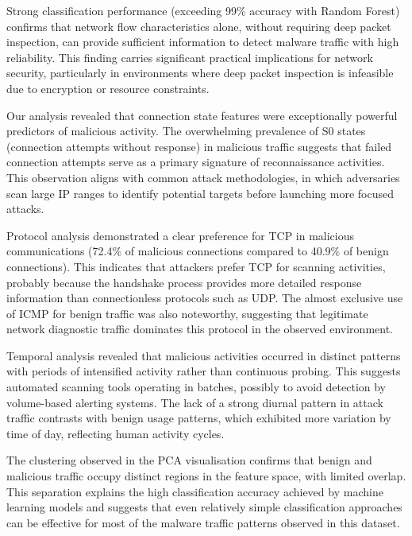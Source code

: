 Strong classification performance (exceeding 99\% accuracy with Random Forest) confirms that network flow characteristics alone, without requiring deep packet inspection, can provide sufficient information to detect malware traffic with high reliability. This finding carries significant practical implications for network security, particularly in environments where deep packet inspection is infeasible due to encryption or resource constraints.

Our analysis revealed that connection state features were exceptionally powerful predictors of malicious activity. The overwhelming prevalence of S0 states (connection attempts without response) in malicious traffic suggests that failed connection attempts serve as a primary signature of reconnaissance activities. This observation aligns with common attack methodologies, in which adversaries scan large IP ranges to identify potential targets before launching more focused attacks.

Protocol analysis demonstrated a clear preference for TCP in malicious communications (72.4\% of malicious connections compared to 40.9\% of benign connections). This indicates that attackers prefer TCP for scanning activities, probably because the handshake process provides more detailed response information than connectionless protocols such as UDP. The almost exclusive use of ICMP for benign traffic was also noteworthy, suggesting that legitimate network diagnostic traffic dominates this protocol in the observed environment.

Temporal analysis revealed that malicious activities occurred in distinct patterns with periods of intensified activity rather than continuous probing. This suggests automated scanning tools operating in batches, possibly to avoid detection by volume-based alerting systems. The lack of a strong diurnal pattern in attack traffic contrasts with benign usage patterns, which exhibited more variation by time of day, reflecting human activity cycles.

The clustering observed in the PCA visualisation confirms that benign and malicious traffic occupy distinct regions in the feature space, with limited overlap. This separation explains the high classification accuracy achieved by machine learning models and suggests that even relatively simple classification approaches can be effective for most of the malware traffic patterns observed in this dataset.